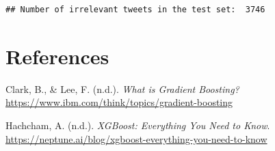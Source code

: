 \documentclass[
]{article}
\newenvironment{Shaded}{\begin{snugshade}}{\end{snugshade}}
\newcommand{\DecValTok}[1]{\textcolor[rgb]{0.00,0.00,0.81}{#1}}
\newcommand{\FunctionTok}[1]{\textcolor[rgb]{0.13,0.29,0.53}{\textbf{#1}}}
\newcommand{\NormalTok}[1]{#1}
\newcommand{\SpecialCharTok}[1]{\textcolor[rgb]{0.81,0.36,0.00}{\textbf{#1}}}
\newcommand{\StringTok}[1]{\textcolor[rgb]{0.31,0.60,0.02}{#1}}
\newlength{\cslhangindent}
\newenvironment{CSLReferences}[2] %
 {\begin{list}{}{%
  \setlength{\itemindent}{0pt}
  \setlength{\leftmargin}{0pt}
  \setlength{\parsep}{0pt}
  \ifodd #1
   \setlength{\leftmargin}{\cslhangindent}
   \setlength{\itemindent}{-1\cslhangindent}
  \fi
  \setlength{\itemsep}{#2\baselineskip}}}
 {\end{list}}
\begin{document}
\begin{Shaded}
\end{Shaded}

\begin{verbatim}
## Number of irrelevant tweets in the test set:  3746
\end{verbatim}

\newpage

\section*{References}\label{references}

\label{refs}
\begin{CSLReferences}{1}{0}
Clark, B., \& Lee, F. (n.d.). \emph{What is Gradient Boosting?}
\url{https://www.ibm.com/think/topics/gradient-boosting}

Hachcham, A. (n.d.). \emph{XGBoost: Everything You Need to Know}.
\url{https://neptune.ai/blog/xgboost-everything-you-need-to-know}

\end{CSLReferences}
\end{document}
